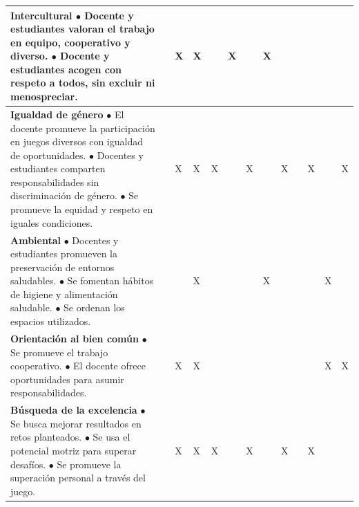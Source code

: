 \documentclass[11pt,a4paper]{article}
\begin{document}
\begin{adjustbox}{max width=\textwidth}
\begin{tabular}{|>{\RaggedRight\arraybackslash}m{5.3cm}|
>{\centering\arraybackslash}m{0.9cm}|
*{11}{>{\centering\arraybackslash}m{0.9cm}|}}
\textbf{Intercultural} \newline
{\footnotesize $\bullet$ Docente y estudiantes valoran el trabajo en equipo, cooperativo y diverso. \newline
$\bullet$ Docente y estudiantes acogen con respeto a todos, sin excluir ni menospreciar.} &
 & X & X & & X & & X & & & & & \\
\hline

\textbf{Igualdad de género} \newline
{\footnotesize $\bullet$ El docente promueve la participación en juegos diversos con igualdad de oportunidades. \newline
$\bullet$ Docentes y estudiantes comparten responsabilidades sin discriminación de género. \newline
$\bullet$ Se promueve la equidad y respeto en iguales condiciones.} &
 & X & X & X & & X & & X & & X & & X \\
\hline

\textbf{Ambiental} \newline
{\footnotesize $\bullet$ Docentes y estudiantes promueven la preservación de entornos saludables. \newline
$\bullet$ Se fomentan hábitos de higiene y alimentación saludable. \newline
$\bullet$ Se ordenan los espacios utilizados.} &
 & & X & & & & X & & & & X & \\
\hline

\textbf{Orientación al bien común} \newline
{\footnotesize $\bullet$ Se promueve el trabajo cooperativo. \newline
$\bullet$ El docente ofrece oportunidades para asumir responsabilidades.} &
 & X & X & & & & & & & & X & X \\
\hline

\textbf{Búsqueda de la excelencia} \newline
{\footnotesize $\bullet$ Se busca mejorar resultados en retos planteados. \newline
$\bullet$ Se usa el potencial motriz para superar desafíos. \newline
$\bullet$ Se promueve la superación personal a través del juego.} &
 & X & X & X & & X & & X & & X & & \\
\hline

\end{tabular}
\end{adjustbox}
\end{document}
